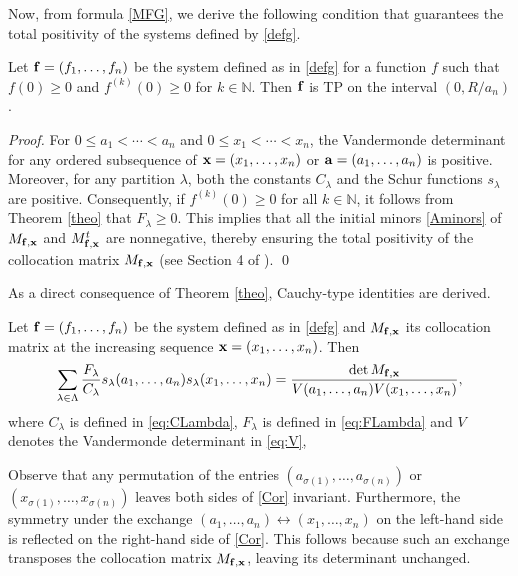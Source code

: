 \documentclass[smallextended]{svjour3}       %
\begin{document}
Now, from formula \eqref{MFG}, we derive the following condition that guarantees the total positivity of the systems  defined by \eqref{defg}.

\begin{theorem}\label{TheoremTP}
Let \( {\bf f} = (f_1,  \dots, f_n) \) be the system defined as in \eqref{defg} for a function $f$ such that $f(0)\geq 0$  and $f^{(k)}(0)\geq 0$ for $k\in \mathbb{N}$.  Then ${\bf f}$ is TP on the interval $(0,R/a_n)$. 
\end{theorem}
\begin{proof}
For \( 0 \leq a_1 < \cdots < a_n \) and \( 0 \leq x_1 < \cdots < x_n \), the Vandermonde determinant for any ordered subsequence of \({\bf x} = (x_1, \ldots, x_n)\) or \({\bf a} = (a_1, \ldots, a_n)\) is positive.  
Moreover, for any partition \(\lambda\), both the constants \(C_\lambda\) and the Schur functions \(s_\lambda\) are positive. Consequently,  if \(f^{(k)}(0) \geq 0\) for all \(k \in \mathbb{N}\), it follows from Theorem \ref{theo} that \(F_\lambda \geq 0\). 
This implies that all the initial minors  \eqref{Aminors} of \(M_{\bf f, \bf x}\) and \(M^t_{\bf f, \bf x}\) are nonnegative, thereby ensuring the total positivity of the collocation matrix \(M_{\bf f, \bf x}\) (see Section 4 of \cite{Gasca1}).    \qed
\end{proof}

As a direct consequence of Theorem \ref{theo}, Cauchy-type identities are derived.

\begin{corollary} \label{Theorem}
  Let  \( {\bf f} = (f_1,  \dots, f_n) \) be the system defined  as in \eqref{defg} and    \(M_{\bf f,  \bf x} \) its collocation matrix 
at the increasing sequence ${\bf x}=(x_1,\dots, x_n)$. Then
\begin{equation}\label{Cor}
 \sum_{\lambda\in \Lambda  }\frac{F_\lambda}{C_\lambda}s_{\lambda}(a_1,\dots,a_n)s_{\lambda}(x_{1},\dots,x_n)=\frac{\det  M_{\bf f,  \bf x} }{ V(a_{1},\dots,a_n) V(x_{1},\dots,x_n)},
\end{equation}
where $C_{\lambda}$    is defined in \eqref{eq:CLambda}, $F_{\lambda}$    is defined in \eqref{eq:FLambda} and $V$ denotes the Vandermonde determinant  in  \eqref{eq:V}, 
\end{corollary}

 

Observe that any permutation  of the entries \((a_{\sigma(1)}, \dots, a_{\sigma(n)})\) or \((x_{\sigma(1)}, \dots, x_{\sigma(n)})\) leaves both sides of \eqref{Cor} invariant.  Furthermore, the symmetry under the exchange \((a_1, \dots, a_n) \leftrightarrow (x_1, \dots, x_n)\) on the left-hand side is reflected on the right-hand side of  \eqref{Cor}. This follows because such an exchange transposes the collocation matrix \( M_{\bf f,  \bf x}\), leaving its determinant unchanged.  
\end{document}
